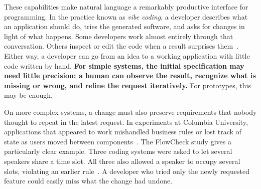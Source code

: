 
These capabilities make natural language a remarkably productive interface for programming. In the practice known as \emph{vibe coding}, a developer describes what an application should do, tries the generated software, and asks for changes in light of what happens. Some developers work almost entirely through that conversation. Others inspect or edit the code when a result surprises them~\citep{sarkar2025vibe,chou2026vibe}. Either way, a developer can go from an idea to a working application with little code written by hand. \textbf{For simple systems, the initial specification may need little precision: a human can observe the result, recognize what is missing or wrong, and refine the request iteratively.} For prototypes, this may be enough.

On more complex systems, a change must also preserve requirements that nobody thought to repeat in the latest request. In experiments at Columbia University, applications that appeared to work mishandled business rules or lost track of state as users moved between components~\citep{vir2026failurepatterns}. The FlowCheck study gives a particularly clear example. Three coding systems were asked to let several speakers share a time slot. All three also allowed a speaker to occupy several slots, violating an earlier rule~\citep{vir2026flowcheck}. A developer who tried only the newly requested feature could easily miss what the change had undone.




